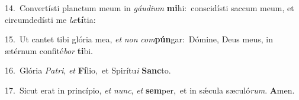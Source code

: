 {\numbfont\textcolor{\numbcolor}{14.}}~Convertísti planctum meum in \textit{gáu}\-\textit{di}\textit{um} \textbf{mi}\-hi:~\star conscidísti saccum meum, et circumdedísti me \textit{læ}\-\textbf{tí}tia:\par
{\numbfont\textcolor{\numbcolor}{15.}}~Ut cantet tibi glória mea, \textit{et} \textit{non} \textit{com}\-\textbf{pún}gar:~\star Dómine, Deus meus, in ætérnum confité\textit{bor} \textbf{ti}\-bi.\par
{\numbfont\textcolor{\numbcolor}{16.}}~Glória \textit{Pa}\-\textit{tri}, \textit{et} \textbf{Fí}\-lio,~\star et Spirítu\textit{i} \textbf{Sanc}\-to.\par
{\numbfont\textcolor{\numbcolor}{17.}}~Sicut erat in princípio, \textit{et} \textit{nunc}\-, \textit{et} \textbf{sem}\-per,~\star et in sǽcula sæculó\-\textit{rum}\-. \textbf{A}\-men.\par
